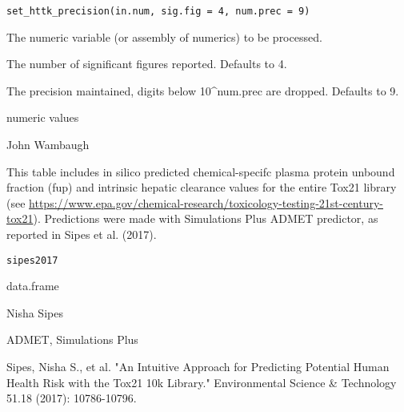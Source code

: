 \documentclass[a4paper]{book}
\begin{document}
%
\begin{Usage}
\begin{verbatim}
set_httk_precision(in.num, sig.fig = 4, num.prec = 9)
\end{verbatim}
\end{Usage}
%
\begin{Arguments}
\begin{ldescription}
\item[\code{in.num}] The numeric variable (or assembly of numerics) to be
processed.

\item[\code{sig.fig}] The number of significant figures reported. Defaults to 4.

\item[\code{num.prec}] The precision maintained, digits below 10\textasciicircum{}num.prec are 
dropped. Defaults to 9.
\end{ldescription}
\end{Arguments}
%
\begin{Value}
numeric values
\end{Value}
%
\begin{Author}\relax
John Wambaugh
\end{Author}
%
\begin{Description}\relax
This table includes in silico predicted chemical-specifc plasma protein 
unbound fraction (fup) and intrinsic hepatic clearance values for the entire
Tox21 library 
(see \url{https://www.epa.gov/chemical-research/toxicology-testing-21st-century-tox21}). 
Predictions were made with Simulations Plus ADMET predictor,
as reported in Sipes et al. (2017).
\end{Description}
%
\begin{Usage}
\begin{verbatim}
sipes2017
\end{verbatim}
\end{Usage}
%
\begin{Format}
data.frame
\end{Format}
%
\begin{Author}\relax
Nisha Sipes
\end{Author}
%
\begin{Source}\relax
ADMET, Simulations Plus
\end{Source}
%
\begin{References}\relax
Sipes, Nisha S., et al. "An Intuitive Approach for Predicting
Potential Human Health Risk with the Tox21 10k Library." Environmental
Science \& Technology 51.18 (2017): 10786-10796.
\end{References}
\end{document}
